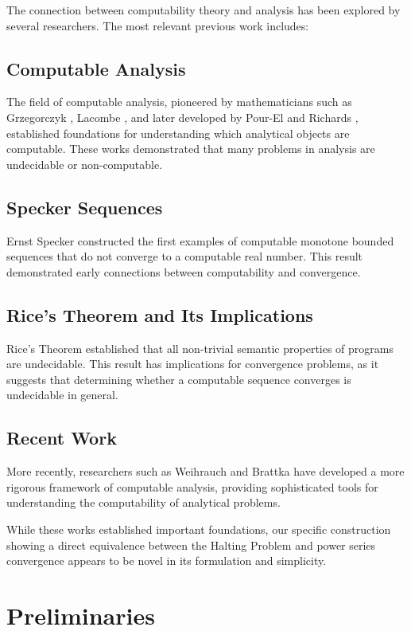 \documentclass[12pt, a4paper]{article}
\begin{document}
The connection between computability theory and analysis has been explored by several researchers. The most relevant previous work includes:

\subsection{Computable Analysis}
The field of computable analysis, pioneered by mathematicians such as Grzegorczyk \cite{grzegorczyk1955computable}, Lacombe \cite{lacombe1955extension}, and later developed by Pour-El and Richards \cite{pourel1989computable}, established foundations for understanding which analytical objects are computable. These works demonstrated that many problems in analysis are undecidable or non-computable.

\subsection{Specker Sequences}
Ernst Specker \cite{specker1949nicht} constructed the first examples of computable monotone bounded sequences that do not converge to a computable real number. This result demonstrated early connections between computability and convergence.

\subsection{Rice's Theorem and Its Implications}
Rice's Theorem \cite{rice1953classes} established that all non-trivial semantic properties of programs are undecidable. This result has implications for convergence problems, as it suggests that determining whether a computable sequence converges is undecidable in general.

\subsection{Recent Work}
More recently, researchers such as Weihrauch \cite{weihrauch2000computable} and Brattka \cite{brattka2008computable} have developed a more rigorous framework of computable analysis, providing sophisticated tools for understanding the computability of analytical problems.

While these works established important foundations, our specific construction showing a direct equivalence between the Halting Problem and power series convergence appears to be novel in its formulation and simplicity.

\section{Preliminaries}
\end{document}
